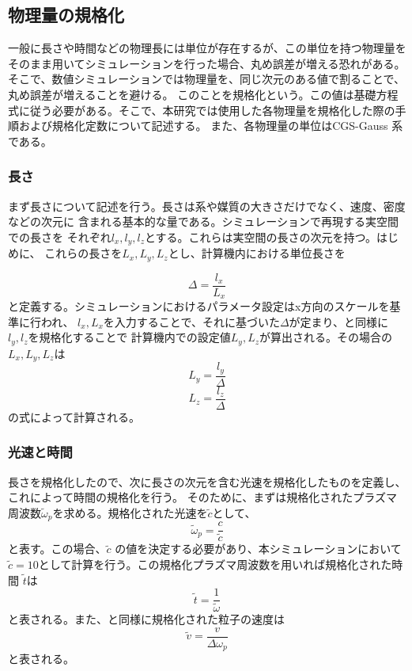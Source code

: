 \documentclass[a4paper,11pt,titlepage]{jarticle}
\numberwithin{equation}{section} %
\begin{document}
  \subsection{物理量の規格化}
  一般に長さや時間などの物理長には単位が存在するが、この単位を持つ物理量をそのまま用いてシミュレーションを行った場合、丸め誤差が増える恐れがある。\\
  そこで、数値シミュレーションでは物理量を、同じ次元のある値で割ることで、丸め誤差が増えることを避ける。
  このことを規格化という。この値は基礎方程式に従う必要がある。そこで、本研究では使用した各物理量を規格化した際の手順および規格化定数について記述する。
  また、各物理量の単位はCGS-Gauss 系である。\\
  \subsubsection{長さ}
  まず長さについて記述を行う。長さは系や媒質の大きさだけでなく、速度、密度などの次元に
  含まれる基本的な量である。シミュレーションで再現する実空間での長さを
  それぞれ$l_x,l_y,l_z$とする。これらは実空間の長さの次元を持つ。はじめに、
  これらの長さを$L_x,L_y,L_z$とし、計算機内における単位長さを

  \begin{equation}
    \label{eq:3-2-1}
    \Delta = \frac{l_x}{L_x}
  \end{equation}
  と定義する。シミュレーションにおけるパラメータ設定はx方向のスケールを基準に行われ、
  $l_x,L_x$を入力することで、それに基づいた$\Delta$が定まり、と同様に$l_y,l_z$を規格化することで
  計算機内での設定値$L_y,L_z$が算出される。その場合の$L_x,L_y,L_z$は
  \begin{equation}
    \label{eq:3-2-2}
    L_y=\frac{l_y}{\Delta}
  \end{equation}
  \begin{equation}
    \label{eq:3-2-3}
    L_z=\frac{l_z}{\Delta}
  \end{equation}
  の式によって計算される。\\
  \subsubsection{光速と時間}
  長さを規格化したので、次に長さの次元を含む光速を規格化したものを定義し、これによって時間の規格化を行う。
  そのために、まずは規格化されたプラズマ周波数$\tilde \omega_p$を求める。規格化された光速を$\tilde c$として、
  \begin{equation}
    \label{eq:3-2-4}
    \tilde \omega_p = \frac{c}{\tilde c}
  \end{equation}
  と表す。この場合、$\tilde c$ の値を決定する必要があり、本シミュレーションにおいて
  $\tilde c=10$として計算を行う。この規格化プラズマ周波数を用いれば規格化された時間
  $\tilde t$は
  \begin{equation}
    \label{eq:3-2-5}
    \tilde t=\frac{1}{\tilde \omega}
  \end{equation}
  と表される。また、と同様に規格化された粒子の速度は
  \begin{equation}
    \label{eq:3-2-6}
    \tilde v=\frac{v}{\Delta \omega_p}
  \end{equation}
  と表される。\\
\end{document}
